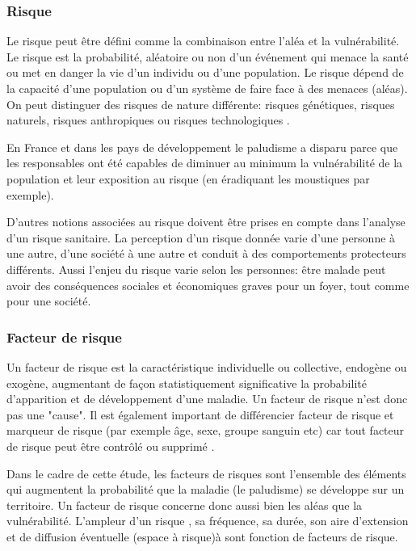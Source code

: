 \subsubsection{Risque}

Le risque peut être défini comme la combinaison entre l'aléa et la vulnérabilité. Le risque est la probabilité, aléatoire ou non d'un événement qui menace la santé ou met en danger la vie d'un individu ou d'une population. Le risque dépend de la capacité d'une population ou d'un système de faire face à des menaces (aléas). On peut distinguer des risques de nature différente: risques génétiques, risques naturels, risques anthropiques ou risques technologiques \citep{ORSN2010}.

En France et dans les pays de développement le paludisme a disparu parce que les responsables ont été capables de diminuer au minimum la vulnérabilité de la population et leur exposition au risque (en éradiquant les moustiques par exemple). 

D'autres notions associées au risque doivent être prises en compte dans l'analyse d'un risque sanitaire. La perception d'un risque donnée varie d'une personne à une autre, d'une société à une autre et conduit à des comportements protecteurs différents. Aussi l'enjeu du risque varie selon les personnes: être malade peut avoir des conséquences sociales et économiques graves pour un foyer, tout comme pour une société.

\subsubsection{Facteur de risque}
Un facteur de risque est la caractéristique individuelle ou collective, endogène ou exogène, augmentant de façon statistiquement significative la probabilité d'apparition et de développement d'une maladie. Un facteur de risque n'est donc pas une "cause". Il est également important de différencier facteur de risque et marqueur de risque (par exemple âge, sexe, groupe sanguin etc) car tout facteur de risque peut être contrôlé ou supprimé \citep{DictionnaireSante}.

Dans le cadre de cette étude, les facteurs de risques sont l'ensemble des éléments qui augmentent la probabilité que la  maladie (le paludisme) se développe sur un territoire. Un facteur de risque concerne donc aussi bien les aléas que la vulnérabilité. L'ampleur d'un risque , sa fréquence, sa durée, son aire d'extension et de diffusion éventuelle (espace à risque)à sont fonction de facteurs de risque.

